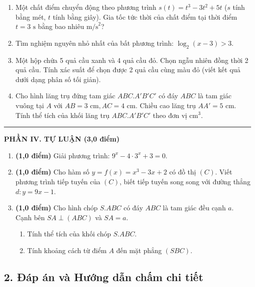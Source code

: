 \documentclass[12pt, a4paper]{article}
\begin{document}
\begin{tcolorbox}[enhanced, colback=white, colframe=blue!70!black, arc=1.5mm, title=\textbf{TRƯỜNG THCS\&THPT HỒNG VÂN -- ĐỀ KIỂM TRA CUỐI NĂM TOÁN 11 (MÃ ĐỀ 101)}]
\begin{enumerate}[label=\textbf{Câu \arabic*.}]
    \item Một chất điểm chuyển động theo phương trình $s(t) = t^3 - 3t^2 + 5t$ ($s$ tính bằng mét, $t$ tính bằng giây). Gia tốc tức thời của chất điểm tại thời điểm $t = 3\text{ s}$ bằng bao nhiêu $\text{m/s}^2$?
    \item Tìm nghiệm nguyên nhỏ nhất của bất phương trình: $\log_2(x - 3) > 3$.
    \item Một hộp chứa 5 quả cầu xanh và 4 quả cầu đỏ. Chọn ngẫu nhiên đồng thời 2 quả cầu. Tính xác suất để chọn được 2 quả cầu cùng màu đỏ (viết kết quả dưới dạng phân số tối giản).
    \item Cho hình lăng trụ đứng tam giác $ABC.A'B'C'$ có đáy $ABC$ là tam giác vuông tại $A$ với $AB = 3\text{ cm}, AC = 4\text{ cm}$. Chiều cao lăng trụ $AA' = 5\text{ cm}$. Tính thể tích của khối lăng trụ $ABC.A'B'C'$ theo đơn vị $\text{cm}^3$.
\end{enumerate}

\vspace{5pt}
\hrule
\vspace{5pt}

\textbf{\large PHẦN IV. TỰ LUẬN (3,0 điểm)}

\begin{enumerate}[label=\textbf{Bài \arabic*.}]
    \item \textbf{(1,0 điểm)} Giải phương trình: $9^x - 4 \cdot 3^x + 3 = 0$.
    \item \textbf{(1,0 điểm)} Cho hàm số $y = f(x) = x^3 - 3x + 2$ có đồ thị $(C)$. Viết phương trình tiếp tuyến của $(C)$, biết tiếp tuyến song song với đường thẳng $d: y = 9x - 1$.
    \item \textbf{(1,0 điểm)} Cho hình chóp $S.ABC$ có đáy $ABC$ là tam giác đều cạnh $a$. Cạnh bên $SA \perp (ABC)$ và $SA = a$.
    \begin{enumerate}[label=\alph*)]
        \item Tính thể tích của khối chóp $S.ABC$.
        \item Tính khoảng cách từ điểm $A$ đến mặt phẳng $(SBC)$.
    \end{enumerate}
\end{enumerate}
\end{tcolorbox}

\vspace{10pt}

\subsection*{2. Đáp án và Hướng dẫn chấm chi tiết}
\end{document}
